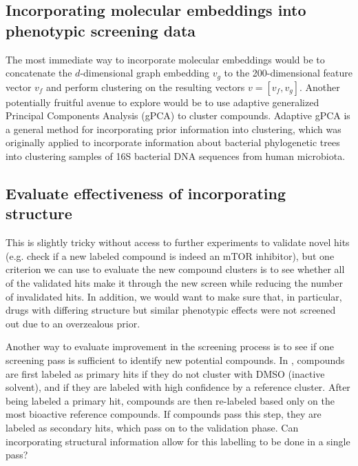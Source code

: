 \documentclass{article}
\begin{document}
\subsection{Incorporating molecular embeddings into phenotypic screening data}

The most immediate way to incorporate molecular embeddings would be to concatenate the $d$-dimensional graph embedding $v_g$ to the 200-dimensional feature vector $v_f$ and perform clustering on the resulting vectors $v = \left[v_f, v_g\right]$. Another potentially fruitful avenue to explore would be to use adaptive generalized Principal Components Analysis (gPCA) \cite{Fukuyama2017} to cluster compounds. Adaptive gPCA is a general method for incorporating prior information into clustering, which was originally applied to incorporate information about bacterial phylogenetic trees into clustering samples of 16S bacterial DNA sequences from human microbiota.

\subsection{Evaluate effectiveness of incorporating structure}

This is slightly tricky without access to further experiments to validate novel hits (e.g. check if a new labeled compound is indeed an mTOR inhibitor), but one criterion we can use to evaluate the new compound clusters is to see whether all of the validated hits make it through the new screen while reducing the number of invalidated hits. In addition, we would want to make sure that, in particular, drugs with differing structure but similar phenotypic effects were not screened out due to an overzealous prior.

Another way to evaluate improvement in the screening process is to see if one screening pass is sufficient to identify new potential compounds. In \cite{Kang2016}, compounds are first labeled as primary hits if they do not cluster with DMSO (inactive solvent), and if they are labeled with high confidence by a reference cluster. After being labeled a primary hit, compounds are then re-labeled based only on the most bioactive reference compounds. If compounds pass this step, they are labeled as secondary hits, which pass on to the validation phase. Can incorporating structural information allow for this labelling to be done in a single pass?

\clearpage
\printbibliography
\end{document}
